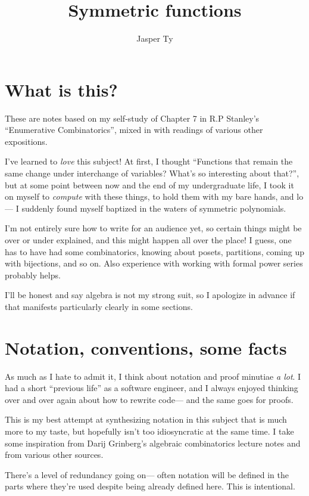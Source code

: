 \documentclass{article}
\title{Symmetric functions}
\author{Jasper Ty}
\date{}
\begin{document}
\maketitle

\section*{What is this?}

These are notes based on my self-study of Chapter 7 in R.P Stanley's ``Enumerative Combinatorics'', mixed in with readings of various other expositions. 

I've learned to \textit{love} this subject! At first, I thought ``Functions that remain the same change under interchange of variables? What's so interesting about that?'', but at some point between now and the end of my undergraduate life, I took it on myself to \textit{compute} with these things, to hold them with my bare hands, and lo--- I suddenly found myself baptized in the waters of symmetric polynomials.

I'm not entirely sure how to write for an audience yet, so certain things might be over or under explained, and this might happen all over the place!
I guess, one has to have had some combinatorics, knowing about posets, partitions, coming up with bijections, and so on. 
Also experience with working with formal power series probably helps.

I'll be honest and say algebra is not my strong suit, so I apologize in advance if that manifests particularly clearly in some sections.

\tableofcontents

\section*{Notation, conventions, some facts}

As much as I hate to admit it, I think about notation and proof minutiae \textit{a lot}.
I had a short ``previous life'' as a software engineer, and I always enjoyed thinking over and over again about how to rewrite code--- and the same goes for proofs.

This is my best attempt at synthesizing notation in this subject that is much more to my taste, but hopefully isn't too idiosyncratic at the same time.
I take some inspiration from Darij Grinberg's algebraic combinatorics lecture notes \cite{DarijAC} and from various other sources.

There's a level of redundancy going on--- often notation will be defined in the parts where they're used despite being already defined here.
This is intentional.
\end{document}
